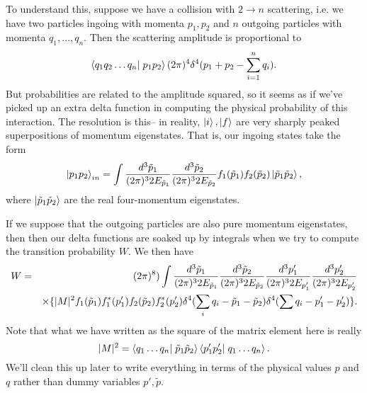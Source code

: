 To understand this, suppose we have a collision with $2\to n$ scattering, i.e. we have two particles ingoing with momenta $p_1,p_2$ and $n$ outgoing particles with momenta $q_1,\ldots,q_n$. Then the scattering amplitude is proportional to
$$\braket{q_1 q_2\ldots q_n}{p_1p_2}(2\pi)^4 \delta^4(p_1+p_2 -\sum_{i=1}^n q_i).$$
But probabilities are related to the amplitude squared, so it seems as if we've picked up an extra delta function in computing the physical probability of this interaction. The resolution is this-- in reality, $\left| i \right>,\left| f \right>$ are very sharply peaked superpositions of momentum eigenstates. That is, our ingoing states take the form
$$\left| p_1p_2 \right>_{in}=\int \frac{d^3 \tilde p_1}{(2\pi)^3 2E_{\tilde p_1}}\frac{d^3 \tilde p_2}{(2\pi)^3 2E_{\tilde p_2}} f_1(\tilde p_1)f_2 (\tilde p_2)\left| \tilde p_1 \tilde p_2 \right>,$$
where $\left| \tilde p_1 \tilde p_2 \right>$ are the real four-momentum eigenstates.

If we suppose that the outgoing particles are also pure momentum eigenstates, then then our delta functions are soaked up by integrals when we try to compute the transition probability $W$. We then have
\begin{eqnarray*}
W&=&(2\pi)^8)\int \frac{d^3 \tilde p_1}{(2\pi)^3 2E_{\tilde p_1}} \frac{d^3 \tilde p_2}{(2\pi)^3 2E_{\tilde p_2}} \frac{d^3 p_1'}{(2\pi)^3 2E_{p_1'}} \frac{d^3 p_2'}{(2\pi)^3 2E_{p_2'}}\\ &&\times\{|M|^2 f_1(\tilde p_1)f_1^* (p_1')f_2(\tilde p_2)f_2^*(p_2')\delta^4(\sum_i q_i -\tilde p_1 -\tilde p_2)\delta^4(\sum q_i-p_1' -p_2')\}.
\end{eqnarray*}
Note that what we have written as the square of the matrix element here is really $$|M|^2=\braket{q_1\ldots q_n}{\tilde p_1 \tilde p_2}\braket{p_1'p_2'}{q_1\ldots q_n}.$$ We'll clean this up later to write everything in terms of the physical values $p$ and $q$ rather than dummy variables $p', \tilde p.$

